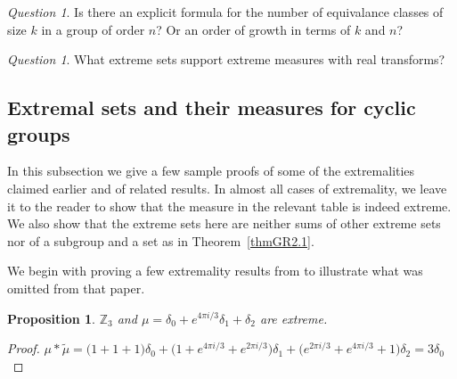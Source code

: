 \documentclass[letter,11pt]{amsart}
\numberwithin{theorem}{section}
\newtheorem{prop}[theorem]{Proposition}
\theoremstyle{remark}
\newtheorem{ques}[theorem]{Question}
\numberwithin{equation}{section}
\newcommand{\thmref}[1]{Theorem~\ref{#1}}
\newcommand{\pii}{\pi i}
\newcommand\Zp[2]{\texttt{$\mathbb Z_{#1}^{\	#2}$}}
\newcommand\omitpf{\omitproof}
\newcommand\omitproof[1]{} %
\begin{document}
 \begin{ques}
 Is there an explicit formula for the number of equivalance classes of size $k$ in a group of order $n$? 
 Or an order of growth in terms of $k$ and $n$?
 \end{ques}
 
 \begin{ques}\label{quesRealTransf}
 What extreme sets support extreme measures with real transforms?
 \end{ques}
\subsection{Extremal sets and their measures for cyclic groups} \label{secProofs}
In this subsection we give a few sample  proofs of some of the extremalities claimed earlier and of related results.
In almost all cases of extremality, we 
leave it to the reader to show that the measure in the relevant table is indeed extreme.
 We also show that the extreme sets here are neither sums of other extreme sets nor of a subgroup and a set as in
 \thmref{thmGR2.1}.



We begin with proving a few extremality results from \cite{MR627683} to illustrate what was omitted from that paper.

\begin{prop}\label{prop3inZ3}
$\Zp{3}{}$ and  $\mu =  \delta_{0}+e^{4\pii/3}\delta_{1}+\delta_{2}
$ are extreme. \newline \end{prop} 


{
\begin{proof} 
$\mu * \tilde \mu 
 = \big(1+1+1\big)\delta_{0}
+\big(1+e^{4\pii/3}+e^{2\pii/3}\big)\delta_{1}
+\big(e^{2\pii/3}+e^{4\pii/3}+1\big)\delta_{2}
=3\delta_{0}
$
\end{proof}
}
\end{document}
